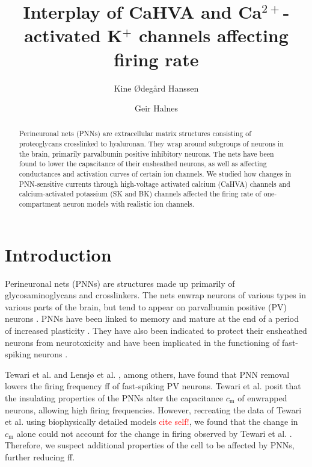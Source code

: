 \documentclass[times, twoside]{zHenriquesLab-StyleBioRxiv}
\title{Interplay of CaHVA and Ca$^{2+}$-activated K$^+$ channels affecting firing rate}
\author[1,\Letter]{Kine Ødegård Hanssen}
\author[2,\Letter]{Geir Halnes}
\affil[1]{Department of Physics, University of Oslo, Oslo, Norway}
\affil[2]{Department of Physics, Norwegian University of Life Sciences, Ås, Norway}
\begin{document}
\maketitle

\begin{abstract}
    Perineuronal nets (PNNs) are extracellular matrix structures consisting of proteoglycans crosslinked to hyaluronan. They wrap around subgroups of neurons in the brain, primarily parvalbumin positive inhibitory neurons. The nets have been found to lower the capacitance of their ensheathed neurons, as well as affecting conductances and activation curves of certain ion channels. We studied how changes in PNN-sensitive currents through high-voltage activated calcium (CaHVA) channels and calcium-activated potassium (SK and BK) channels affected the firing rate of one-compartment neuron models with realistic ion channels.
\end{abstract}

\section*{Introduction}
Perineuronal nets (PNNs) are structures made up primarily of glycosaminoglycans and crosslinkers. The nets enwrap neurons of various types in various parts of the brain, but tend to appear on parvalbumin positive (PV) neurons \cite{van_t_spijker_sweet_2017}. PNNs have been linked to memory and mature at the end of a period of increased plasticity \cite{tsien_very_2013,thompson_removal_2018}. They have also been indicated to protect their ensheathed neurons from neurotoxicity \cite{van_t_spijker_sweet_2017} and have been implicated in the functioning of fast-spiking neurons \cite{tewari_perineuronal_2018,balmer_perineuronal_2016, lensjo_removal_2017}.

Tewari et al. \cite{tewari_perineuronal_2018} and Lensjø et al. \cite{lensjo_removal_2017}, among others, have found that PNN removal lowers the firing frequency ff of fast-spiking PV neurons. Tewari et al. \cite{tewari_perineuronal_2018} posit that the insulating properties of the PNNs alter the capacitance $c_\text{m}$ of enwrapped neurons, allowing high firing frequencies. However, recreating the data of Tewari et al. \cite{tewari_perineuronal_2018} using biophysically detailed models \textcolor{red}{cite self!}, we found that the change in $c_\text{m}$ alone could not account for the change in firing observed by Tewari et al. \cite{tewari_perineuronal_2018}. Therefore, we suspect additional properties of the cell to be affected by PNNs, further reducing ff.
\end{document}
